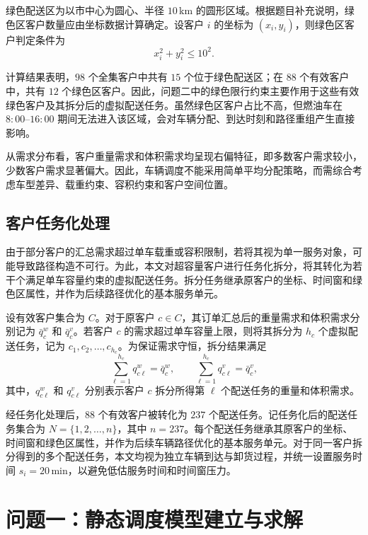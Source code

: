 \documentclass[withoutpreface,bwprint]{cumcmthesis} %
\begin{document}
绿色配送区为以市中心为圆心、半径 $10\,\mathrm{km}$ 的圆形区域。根据题目补充说明，绿色区客户数量应由坐标数据计算确定。设客户 $i$ 的坐标为 $(x_i,y_i)$，则绿色区客户判定条件为
\[
x_i^2+y_i^2\leq 10^2 .
\]

计算结果表明，$98$ 个全集客户中共有 $15$ 个位于绿色配送区；在 $88$ 个有效客户中，共有 $12$ 个绿色区客户。因此，问题二中的绿色限行约束主要作用于这些有效绿色客户及其拆分后的虚拟配送任务。虽然绿色区客户占比不高，但燃油车在 $8{:}00$--$16{:}00$ 期间无法进入该区域，会对车辆分配、到达时刻和路径重组产生直接影响。

从需求分布看，客户重量需求和体积需求均呈现右偏特征，即多数客户需求较小，少数客户需求显著偏大。因此，车辆调度不能采用简单平均分配策略，而需综合考虑车型差异、载重约束、容积约束和客户空间位置。

\subsection{客户任务化处理}

由于部分客户的汇总需求超过单车载重或容积限制，若将其视为单一服务对象，可能导致路径构造不可行。为此，本文对超容量客户进行任务化拆分，将其转化为若干个满足单车容量约束的虚拟配送任务。拆分任务继承原客户的坐标、时间窗和绿色区属性，并作为后续路径优化的基本服务单元。

设有效客户集合为 $C$。对于原客户 $c\in C$，其订单汇总后的重量需求和体积需求分别记为 $\bar q_c^w$ 和 $\bar q_c^v$。若客户 $c$ 的需求超过单车容量上限，则将其拆分为 $h_c$ 个虚拟配送任务，记为 $c_1,c_2,\ldots,c_{h_c}$。为保证需求守恒，拆分结果满足
\begin{equation}
\sum_{\ell=1}^{h_c} q_{c\ell}^w=\bar q_c^w,\qquad
\sum_{\ell=1}^{h_c} q_{c\ell}^v=\bar q_c^v,
\end{equation}
其中，$q_{c\ell}^w$ 和 $q_{c\ell}^v$ 分别表示客户 $c$ 拆分所得第 $\ell$ 个配送任务的重量和体积需求。

经任务化处理后，$88$ 个有效客户被转化为 $237$ 个配送任务。记任务化后的配送任务集合为 $N=\{1,2,\ldots,n\}$，其中 $n=237$。每个配送任务继承其原客户的坐标、时间窗和绿色区属性，并作为后续车辆路径优化的基本服务单元。对于同一客户拆分得到的多个配送任务，本文均视为独立车辆到达与卸货过程，并统一设置服务时间 $s_i=20\,\mathrm{min}$，以避免低估服务时间和时间窗压力。


\section{问题一：静态调度模型建立与求解}
\end{document}
